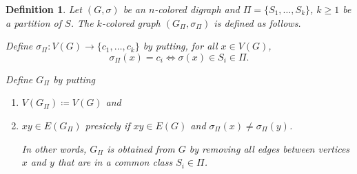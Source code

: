 \documentclass[final,3p,times]{elsarticle}
\newtheorem{definition}{Definition}[section]
\newcommand{\TODO}[1]{\begingroup\color{red}#1\endgroup}
\begin{document}
%	


	
	
\begin{definition}
	Let $(G,\sigma)$ be an $n$-colored digraph and $\Pi = \{S_1,\dots,S_k\}$, $k\geq 1$
	be a partition of $S$. The $k$-colored graph $(G_{\Pi},\sigma_{\Pi})$ is defined as follows. 
	
	
	Define $\sigma_{\Pi}\colon V(G) \to \{c_1,\dots,c_k\}$ by putting, for all $x\in V(G)$, 
    \[\sigma_{\Pi}(x)=c_i \iff \sigma(x)\in S_i\in \Pi.\] 
    
    Define  $G_{\Pi}$ by putting
	\begin{enumerate}
    	\item $V(G_{\Pi}) \coloneqq V(G)$ and
    
    \item $xy\in E(G_{\Pi})$  presicely if $xy\in E(G)$ and 
    	  $\sigma_{\Pi}(x)\neq \sigma_{\Pi}(y)$. 
    	  
    	  In other words,  $G_{\Pi}$ 
    	  is obtained from $G$ by removing all
    	  edges between vertices $x$ and $y$ that are 
    	  in a common class $S_i\in \Pi$. 
\end{enumerate}
\end{definition}	
	
	
\end{document}
